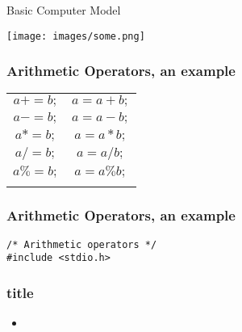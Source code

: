 \begin{frame}
\titlepage
\end{frame}


\begin{frame}{Basic Computer Model}
\begin{center}
\bigskip
\texttt{[image: images/some.png]}
\end{center}
\end{frame}

\begin{frame}[fragile]
\frametitle{Arithmetic Operators, an example}
\begin{tabular}{@{}c|c@{}}\toprule
$a += b;$ & $a = a + b;$\\
$a -= b;$ & $a = a - b;$\\
$a *= b;$ & $a = a * b;$\\
$a /= b;$ & $a = a / b;$\\
$a \% = b;$ & $a = a \% b;$\\
\\\bottomrule
\end{tabular}
\end{frame}

\begin{frame}[fragile]
\frametitle{Arithmetic Operators, an example}
\begin{lstlisting}
/* Arithmetic operators */
#include <stdio.h>

\end{lstlisting}
\end{frame}

\begin{frame}[fragile]
\frametitle{title}
\begin{itemize}
\item 
\end{itemize}
\end{frame}

